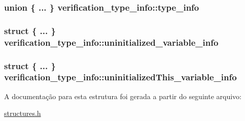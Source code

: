 \subsubsection[{\texorpdfstring{type\+\_\+info}{type_info}}]{\setlength{\rightskip}{0pt plus 5cm}union \{ ... \}   verification\+\_\+type\+\_\+info\+::type\+\_\+info}\hypertarget{structverification__type__info_ab47e1887d0e10211164b9d0a16d79565}{}\label{structverification__type__info_ab47e1887d0e10211164b9d0a16d79565}
\subsubsection[{\texorpdfstring{uninitialized\+\_\+variable\+\_\+info}{uninitialized_variable_info}}]{\setlength{\rightskip}{0pt plus 5cm}struct \{ ... \}   verification\+\_\+type\+\_\+info\+::uninitialized\+\_\+variable\+\_\+info}\hypertarget{structverification__type__info_add124f08b7f592406443d601651970d9}{}\label{structverification__type__info_add124f08b7f592406443d601651970d9}
\subsubsection[{\texorpdfstring{uninitialized\+This\+\_\+variable\+\_\+info}{uninitializedThis_variable_info}}]{\setlength{\rightskip}{0pt plus 5cm}struct \{ ... \}   verification\+\_\+type\+\_\+info\+::uninitialized\+This\+\_\+variable\+\_\+info}\hypertarget{structverification__type__info_a9b1dd36fc75aad3dc228875395a1c4ef}{}\label{structverification__type__info_a9b1dd36fc75aad3dc228875395a1c4ef}


A documentação para esta estrutura foi gerada a partir do seguinte arquivo\+:\begin{DoxyCompactItemize}
\item 
\hyperlink{structures_8h}{structures.\+h}\end{DoxyCompactItemize}
